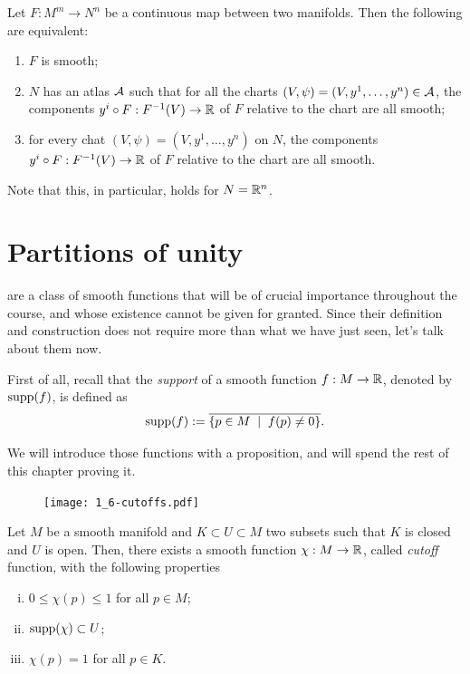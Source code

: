 \begin{exercise}
  Let $F: M^m \to N^n$ be a continuous map between two manifolds. Then the following are equivalent:
  \begin{enumerate}
    \item $F$ is smooth;
    \item $N$ has an atlas $\mathcal{A}$ such that for all the charts $(V, \psi) = (V, y^1, \ldots, y^n)\in \mathcal{A}$, the components $y^i \circ F: F^{-1}(V) \to \mathbb{R}$ of $F$ relative to the chart are all smooth;
    \item for every chat $(V, \psi) = (V, y^1, \ldots, y^n)$ on $N$, the components $y^i \circ F: F^{-1}(V) \to \mathbb{R}$ of $F$ relative to the chart are all smooth.
  \end{enumerate}
  Note that this, in particular, holds for $N=\mathbb{R}^n$.
\end{exercise}

\section{Partitions of unity}

 are a class of smooth functions that will be of crucial importance throughout the course, and whose existence cannot be given for granted.
Since their definition and construction does not require more than what we have just seen, let's talk about them now.

First of all, recall that the \emph{support} of a smooth function $f: M \to \mathbb{R}$, denoted by $\operatorname{supp}(f)$, is defined as
\begin{equation}
  \operatorname{supp}(f) := \overline{\{ p\in M \;\mid\; f(p) \neq 0\}}.
\end{equation}

We will introduce those functions with a proposition, and will spend the rest of this chapter proving it.

\begin{figure}[htp!]
  \texttt{[image: 1\_6-cutoffs.pdf]}
\end{figure}

\begin{proposition}\label{prop:cutoff}
  Let $M$ be a smooth manifold and $K\subset U\subset M$ two subsets such that $K$ is closed and $U$ is open.
  Then, there exists a smooth function $\chi: M \to\mathbb{R}$, called \emph{cutoff} function, with the following properties
  \begin{enumerate}[(i)]
    \item $0 \leq \chi(p) \leq 1$ for all $p\in M$;
    \item $\operatorname{supp}(\chi)\subset U$;
    \item $\chi(p) = 1$ for all $p\in K$.
  \end{enumerate}
\end{proposition}

